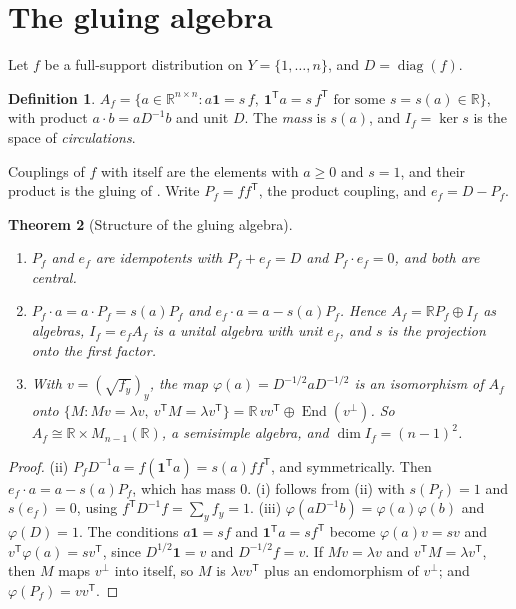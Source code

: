 \documentclass[11pt]{article}
\newtheorem{theorem}{Theorem}[section]
\theoremstyle{definition}
\newtheorem{definition}[theorem]{Definition}
\theoremstyle{remark}
\newcommand{\R}{\mathbb{R}}
\newcommand{\diag}{\operatorname{diag}}
\newcommand{\T}{\mathsf T}
\begin{document}
\section{The gluing algebra}\label{sec:gluing}

Let $f$ be a full-support distribution on $Y=\{1,\dots,n\}$, and $D=\diag(f)$.

\begin{definition}\label{def:Af}
$A_f=\{a\in\R^{n\times n}:a\mathbf 1=s\,f,\ \mathbf 1^\T a=s\,f^\T\text{ for some }s=s(a)\in\R\}$, with product
$a\cdot b=aD^{-1}b$ and unit $D$. The \emph{mass} is $s(a)$, and $I_f=\ker s$ is the space of \emph{circulations}.
\end{definition}

Couplings of $f$ with itself are the elements with $a\ge0$ and $s=1$, and their product is the gluing of
\cite[Thm.~2.3]{Conditionals}. Write $P_f=ff^\T$, the product coupling, and $e_f=D-P_f$.

\begin{theorem}[Structure of the gluing algebra]\label{thm:structure}
\begin{enumerate}[label=(\roman*)]
\item $P_f$ and $e_f$ are idempotents with $P_f+e_f=D$ and $P_f\cdot e_f=0$, and both are central.
\item $P_f\cdot a=a\cdot P_f=s(a)P_f$ and $e_f\cdot a=a-s(a)P_f$. Hence $A_f=\R P_f\oplus I_f$ as algebras, $I_f=e_fA_f$ is a
  unital algebra with unit $e_f$, and $s$ is the projection onto the first factor.
\item With $v=(\sqrt{f_y})_y$, the map $\varphi(a)=D^{-1/2}aD^{-1/2}$ is an isomorphism of $A_f$ onto
  $\{M:Mv=\lambda v,\ v^\T M=\lambda v^\T\}=\R\,vv^\T\oplus\operatorname{End}(v^\perp)$. So
  $A_f\cong\R\times M_{n-1}(\R)$, a semisimple algebra, and $\dim I_f=(n-1)^2$.
\end{enumerate}
\end{theorem}
\begin{proof}
(ii) $P_fD^{-1}a=f(\mathbf 1^\T a)=s(a)ff^\T$, and symmetrically. Then $e_f\cdot a=a-s(a)P_f$, which has mass $0$. (i) follows
from (ii) with $s(P_f)=1$ and $s(e_f)=0$, using $f^\T D^{-1}f=\sum_yf_y=1$. (iii) $\varphi(aD^{-1}b)=\varphi(a)\varphi(b)$ and
$\varphi(D)=1$. The conditions $a\mathbf 1=sf$ and $\mathbf 1^\T a=sf^\T$ become $\varphi(a)v=sv$ and $v^\T\varphi(a)=sv^\T$, since
$D^{1/2}\mathbf 1=v$ and $D^{-1/2}f=v$. If $Mv=\lambda v$ and $v^\T M=\lambda v^\T$, then $M$ maps $v^\perp$ into itself, so $M$ is
$\lambda vv^\T$ plus an endomorphism of $v^\perp$; and $\varphi(P_f)=vv^\T$.
\end{proof}
\end{document}
